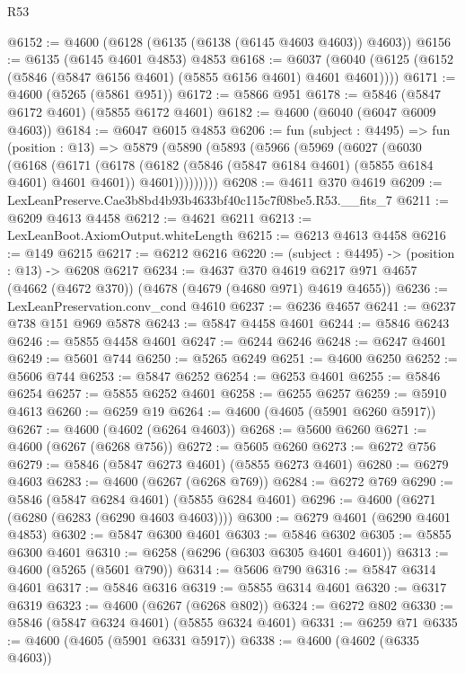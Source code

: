 \begin{lexlean}{R53}
\begin{coremodule}
@6152 := @4600 (@6128 (@6135 (@6138 (@6145 @4603 @4603)) @4603))
@6156 := @6135 (@6145 @4601 @4853) @4853
@6168 := @6037 (@6040 (@6125 (@6152 (@5846 (@5847 @6156 @4601) (@5855 @6156 @4601) @4601 @4601))))
@6171 := @4600 (@5265 (@5861 @951))
@6172 := @5866 @951
@6178 := @5846 (@5847 @6172 @4601) (@5855 @6172 @4601)
@6182 := @4600 (@6040 (@6047 @6009 @4603))
@6184 := @6047 @6015 @4853
@6206 := fun (subject : @4495) =>
  fun (position : @13) =>
  @5879
    (@5890
      (@5893
        (@5966
          (@5969
            (@6027
              (@6030
                (@6168
                  (@6171
                    (@6178
                      (@6182 (@5846 (@5847 @6184 @4601) (@5855 @6184 @4601) @4601 @4601))
                      @4601)))))))))
@6208 := @4611 @370 @4619
@6209 := LexLeanPreserve.Cae3b8bd4b93b4633bf40c115c7f08be5.R53.__fits_7
@6211 := @6209 @4613 @4458
@6212 := @4621 @6211
@6213 := LexLeanBoot.AxiomOutput.whiteLength
@6215 := @6213 @4613 @4458
@6216 := @149 @6215
@6217 := @6212 @6216
@6220 := (subject : @4495) -> (position : @13) -> @6208 @6217
@6234 := @4637
    @370
    @4619
    @6217
    @971
    @4657
    (@4662 (@4672 @370))
    (@4678 (@4679 (@4680 @971) @4619 @4655))
@6236 := LexLeanPreservation.conv_cond @4610
@6237 := @6236 @4657
@6241 := @6237 @738 @151 @969 @5878
@6243 := @5847 @4458 @4601
@6244 := @5846 @6243
@6246 := @5855 @4458 @4601
@6247 := @6244 @6246
@6248 := @6247 @4601
@6249 := @5601 @744
@6250 := @5265 @6249
@6251 := @4600 @6250
@6252 := @5606 @744
@6253 := @5847 @6252
@6254 := @6253 @4601
@6255 := @5846 @6254
@6257 := @5855 @6252 @4601
@6258 := @6255 @6257
@6259 := @5910 @4613
@6260 := @6259 @19
@6264 := @4600 (@4605 (@5901 @6260 @5917))
@6267 := @4600 (@4602 (@6264 @4603))
@6268 := @5600 @6260
@6271 := @4600 (@6267 (@6268 @756))
@6272 := @5605 @6260
@6273 := @6272 @756
@6279 := @5846 (@5847 @6273 @4601) (@5855 @6273 @4601)
@6280 := @6279 @4603
@6283 := @4600 (@6267 (@6268 @769))
@6284 := @6272 @769
@6290 := @5846 (@5847 @6284 @4601) (@5855 @6284 @4601)
@6296 := @4600 (@6271 (@6280 (@6283 (@6290 @4603 @4603))))
@6300 := @6279 @4601 (@6290 @4601 @4853)
@6302 := @5847 @6300 @4601
@6303 := @5846 @6302
@6305 := @5855 @6300 @4601
@6310 := @6258 (@6296 (@6303 @6305 @4601 @4601))
@6313 := @4600 (@5265 (@5601 @790))
@6314 := @5606 @790
@6316 := @5847 @6314 @4601
@6317 := @5846 @6316
@6319 := @5855 @6314 @4601
@6320 := @6317 @6319
@6323 := @4600 (@6267 (@6268 @802))
@6324 := @6272 @802
@6330 := @5846 (@5847 @6324 @4601) (@5855 @6324 @4601)
@6331 := @6259 @71
@6335 := @4600 (@4605 (@5901 @6331 @5917))
@6338 := @4600 (@4602 (@6335 @4603))

\end{coremodule}
\end{lexlean}
